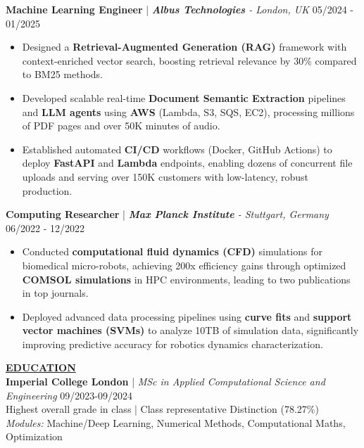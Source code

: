 \documentclass{article}
\newlength{\remaining}
\renewcommand{\section}[1]{
  \vspace{1.0em}\setlength{\remaining}{\textwidth-\widthof{\uppercase{#1}}}
    \noindent\underline{\fontsize{10}{15}\bfseries\uppercase{#1}\hspace*{\remaining}} \\
}
\renewcommand{\subsection}[3]{
    \noindent\textbf{#1} | \emph{#2} \hfill #3  
}
\begin{document}
    \subsection{Machine Learning Engineer}{\textbf{Albus Technologies} - London, UK}{05/2024 - 01/2025}
    \begin{itemize}
        \item Designed a \textbf{Retrieval-Augmented Generation (RAG)} framework with context-enriched vector search, boosting retrieval relevance by 30\% compared to BM25 methods.
        \item Developed scalable real-time \textbf{Document Semantic Extraction} pipelines and \textbf{LLM agents} using \textbf{AWS} (Lambda, S3, SQS, EC2), processing millions of PDF pages and over 50K minutes of audio.
        \item Established automated \textbf{CI/CD} workflows (Docker, GitHub Actions) to deploy \textbf{FastAPI} and \textbf{Lambda} endpoints, enabling dozens of concurrent file uploads and serving over 150K customers with low-latency, robust production.
    \end{itemize}
    

    \subsection{Computing Researcher}{\textbf{Max Planck Institute} - Stuttgart, Germany}{06/2022 - 12/2022}
    \begin{itemize}
        \item Conducted \textbf{computational fluid dynamics (CFD)} simulations for biomedical micro-robots, achieving 200x efficiency gains through optimized \textbf{COMSOL simulations} in HPC environments, leading to two publications in top journals.
        \item Deployed advanced data processing pipelines using \textbf{curve fits} and \textbf{support vector machines (SVMs)} to analyze 10TB of simulation data, significantly improving predictive accuracy for robotics dynamics characterization.
    \end{itemize}


    \section{Education}
    \subsection{Imperial College London}{MSc in Applied Computational Science and Engineering}{09/2023-09/2024} \\
    Highest overall grade in class | Class representative  \hfill Distinction (78.27\%) \\
    \textit{Modules:} Machine/Deep Learning, Numerical Methods, Computational Maths, Optimization
    
\end{document}
